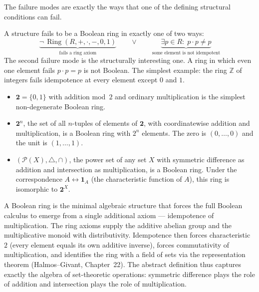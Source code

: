 \begin{remark*}
The failure modes are exactly the ways that one of the defining structural
conditions can fail.
\end{remark*}

\begin{remark*}
A structure fails to be a Boolean ring in exactly one of two ways:
\[
\underbrace{\neg\,\operatorname{Ring}(R,+,\cdot,-,0,1)}_{\text{fails a ring axiom}}
\qquad\lor\qquad
\underbrace{\exists p \in R{:}\; p \cdot p \neq p}_{\text{some element is not idempotent}}
\]
The second failure mode is the structurally interesting one.
A ring in which even one element fails $p \cdot p = p$ is not Boolean.
The simplest example: the ring $\mathbb{Z}$ of integers fails
idempotence at every element except $0$ and $1$.
\end{remark*}

\begin{remark*}
\hfill
\begin{itemize}
  \item $\mathbf{2} = \{0,1\}$ with addition mod~$2$ and ordinary
        multiplication is the simplest non-degenerate Boolean ring.
  \item $\mathbf{2}^n$, the set of all $n$-tuples of elements of
        $\mathbf{2}$, with coordinatewise addition and multiplication,
        is a Boolean ring with $2^n$ elements.
        The zero is $(0,\ldots,0)$ and the unit is $(1,\ldots,1)$.
  \item $(\mathcal{P}(X), \triangle, \cap)$, the power set of any
        set $X$ with symmetric difference as addition and intersection
        as multiplication, is a Boolean ring.
        Under the correspondence $A \leftrightarrow \mathbf{1}_A$
        (the characteristic function of $A$), this ring is isomorphic
        to $\mathbf{2}^X$.
\end{itemize}
\end{remark*}

\begin{remark*}[Interpretation]
A Boolean ring is the minimal algebraic structure that forces
the full Boolean calculus to emerge from a single additional
axiom --- idempotence of multiplication.
The ring axioms supply the additive abelian group and the
multiplicative monoid with distributivity.
Idempotence then forces characteristic~$2$ (every element
equals its own additive inverse), forces commutativity of
multiplication, and identifies the ring with a field of sets
via the representation theorem (Halmos--Givant, Chapter~22).
The abstract definition thus captures exactly the algebra of
set-theoretic operations: symmetric difference plays the role
of addition and intersection plays the role of multiplication.
\end{remark*}

